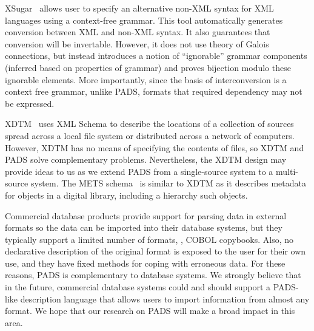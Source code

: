 \documentclass[11pt]{article}
\begin{document}

XSugar~\cite{brabrand+:xsugar2005} allows user to specify an alternative non-XML
syntax for XML languages using a context-free grammar.  This tool
automatically generates conversion between XML and non-XML 
syntax. It also guarantees that
conversion will be invertable.  However, it does not use theory of Galois
connections, but instead introduces a notion of ``ignorable'' grammar
components (inferred based on properties of grammar) and proves
bijection modulo these ignorable elements.  More importantly,
since the basis of interconversion is a context free grammar, unlike PADS,
formats that required dependency may not be expressed.

XDTM~\cite{zhao+:sigmod05,xdtm} uses XML Schema to describe the locations of a collection
of sources spread across a local file system or distributed
across a network of computers.
However, XDTM has no means of specifying the contents of files,
so XDTM and PADS solve complementary problems.  Nevertheless, the XDTM design 
may provide ideas to us as we extend PADS from a single-source system to a
multi-source system. The METS schema~\cite{mets} is similar to XDTM as it describes 
metadata for objects in a digital library,
including a hierarchy such objects. 

Commercial database products provide support for
parsing data in external formats so the data can be imported into
their database systems, but they typically support a limited number of
formats, \eg{}, COBOL copybooks.  Also, no declarative description of the
original format is exposed to the user for their own use, and they
have fixed methods for coping with erroneous data.  For these reasons,
PADS is complementary to database systems.  We strongly believe that
in the future, commercial database systems could and should support a 
PADS-like description language that allows users to import information from
almost any format.  We hope that our research on PADS will make a broad
impact in this area.
\end{document}
